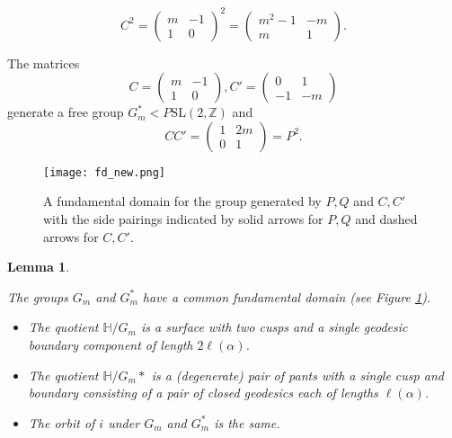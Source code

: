 \documentclass[12pt,a4paper]{amsart}
\newtheorem{lem}[thm]{Lemma}
\def\HH{\mathbb{H}}
\def\ZZ{\mathbb{Z}}
\def\sl2{\mathrm{SL}(2, \ZZ)}
\def\GG{G_m}
\begin{document}
$$
C^2 = \begin{pmatrix} m & -1 \\ 1 & 0 \end{pmatrix}^2 
= \begin{pmatrix} m^2-1 & -m \\ m & 1 \end{pmatrix}.$$

The matrices 
$$
C = \begin{pmatrix} m & -1 \\ 1 & 0 \end{pmatrix},
C' = \begin{pmatrix} 0 & 1 \\ -1 & -m \end{pmatrix}
$$
generate a free group $\GG^* < P\sl2$ and 
$$CC' = \begin{pmatrix} 1 & 2m \\ 0 & 1 \end{pmatrix} = P^2.$$

\begin{figure}[ht]
\begin{center}
\texttt{[image: fd\_new.png]} 
\end{center}
\caption{A fundamental domain for the group generated by $P,Q$ and $C,C'$
with the side pairings indicated by solid arrows for $P,Q$ and dashed arrows for $C,C'$.}
	\label{fig:fund_dom}
\end{figure}

\begin{lem}\label{pants}

The groups $\GG$ and $\GG^*$ have a common fundamental domain
 (see Figure \ref{fig:fund_dom}).
\begin{itemize}
\item
The quotient $\HH/\GG$ is a surface with two cusps and a single geodesic
boundary component of length $2\ell(\alpha)$.
\item
The quotient $\HH/\GG*$ is a 
(degenerate) pair of pants with a single cusp and boundary consisting of a pair
of closed geodesics each of lengths $\ell(\alpha)$.
\item The orbit of $i$ under $\GG$ and $\GG^*$ is the same.
\end{itemize}



\end{lem}
\end{document}
